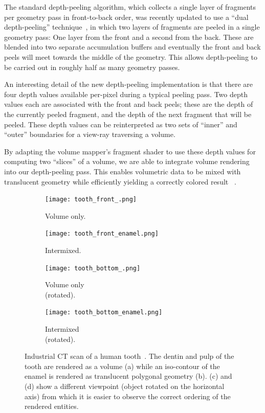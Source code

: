 The standard depth-peeling algorithm, which collects a single layer of fragments
per geometry pass in front-to-back order, was recently updated to use a ``dual
depth-peeling'' technique~\citep{bavoil_order_2008}, in which two layers of
fragments are peeled in a single geometry pass: One layer from the front and a
second from the back. These are blended into two separate accumulation buffers
and eventually the front and back peels will meet towards the middle of the
geometry. This allows depth-peeling to be carried out in roughly half as many
geometry passes.

An interesting detail of the new depth-peeling implementation is that there are
four depth values available per-pixel during a typical peeling pass. Two depth
values each are associated with the front and back peels; these are the depth of
the currently peeled fragment, and the depth of the next fragment that will be
peeled. These depth values can be reinterpreted as two sets of ``inner'' and
``outer'' boundaries for a view-ray traversing a volume.

By adapting the volume mapper's fragment shader to use these depth values for
computing two ``slices'' of a volume, we are able to integrate volume rendering
into our depth-peeling pass. This enables volumetric data to be mixed with
translucent geometry while efficiently yielding a correctly colored result
~.

\begin{figure}[htb]
\centering
  \begin{subfigure}[b]{.35\columnwidth}
    \centering
    \texttt{[image: tooth\_front\_.png]}
    \caption{Volume only.}
    \label{fig:tooth_front}
  \end{subfigure}
  \begin{subfigure}[b]{.35\columnwidth}
    \centering
    \texttt{[image: tooth\_front\_enamel.png]}
    \caption{Intermixed.}
    \label{fig:tooth_front_enamel}
  \end{subfigure}
  \begin{subfigure}[b]{.35\columnwidth}
    \centering
    \texttt{[image: tooth\_bottom\_.png]}
    \caption{Volume only \\(rotated).}
    \label{fig:tooth_bottom}
  \end{subfigure}
  \begin{subfigure}[b]{.35\columnwidth}
    \centering
    \texttt{[image: tooth\_bottom\_enamel.png]}
    \caption{Intermixed \\(rotated).}
    \label{fig:tooth_bottom_enamel}
  \end{subfigure}
  \caption{Industrial CT scan of a human tooth~\citep{pfister_tf_bakeoff_2001}.
    The dentin and pulp of the tooth are rendered as a volume (a) while an
    iso-contour of the enamel is rendered as translucent polygonal geometry (b).
    (c) and (d) show a different viewpoint (object rotated on the horizontal axis)
    from which it is easier to observe the correct ordering of the rendered
    entities.}
  \label{fig:volume_peeling_tooth}
\end{figure}

